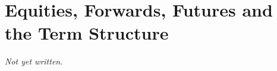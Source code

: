 \chapter{Equities, Forwards, Futures and the Term Structure}\label{ch:equities-derivatives-term-structure}


\textit{Not yet written.}

